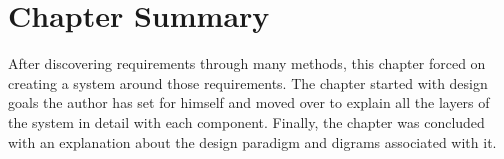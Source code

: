 \section{Chapter Summary}

After discovering requirements through many methods, this chapter forced on creating a system around those requirements. The chapter started with design goals the author has set for himself and moved over to explain all the layers of the system in detail with each component. Finally, the chapter was concluded with an explanation about the design paradigm and digrams associated with it.

